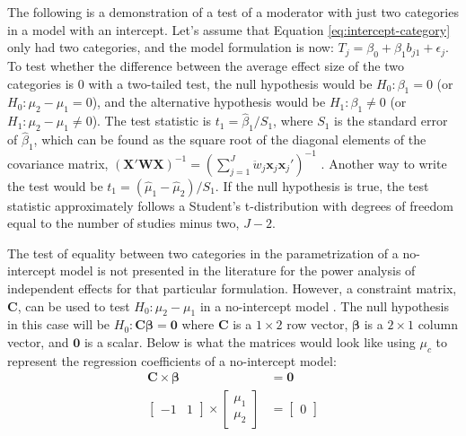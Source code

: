The following is a demonstration of a test of a moderator with just two categories in a model with an intercept. Let's assume that Equation \ref{eq:intercept-category} only had two categories, and the model formulation is now: $T_j = \beta_0 + \beta_1 b_{j1} +\epsilon_j$. To test whether the difference between the average effect size of the two categories is 0 with a two-tailed test, the null hypothesis would be $H_0: \beta_1 = 0$ (or $H_0: \mu_2 - \mu_1 = 0$), and the alternative hypothesis would be $H_1: \beta_1 \neq 0$ (or $H_1: \mu_2 - \mu_1 \neq 0$). The test statistic is $t_1 = \hat{\beta}_1 / S_1$, where $S_1$ is the standard error of $\hat{\beta}_1$, which can be found as the square root of the diagonal elements of the covariance matrix, $(\mathbf{X}'\mathbf{W}\mathbf{X})^{-1} = \left( \sum_{j=1}^J \ddot{w}_j\mathbf{x}_j\mathbf{x}_j' \right)^{-1}$ \autocite{cooper2019}. Another way to write the test would be $t_1 = (\hat{\mu}_1 - \hat{\mu}_2)  /S_1$. If the null hypothesis is true, the test statistic approximately follows a Student's t-distribution with degrees of freedom equal to the number of studies minus two, $J-2$.


The test of equality between two categories in the parametrization of a no-intercept model is not presented in the literature for the power analysis of independent effects for that particular formulation. However, a constraint matrix, $\mathbf{C}$, can be used to test $H_0: \mu_2 - \mu_1$ in a no-intercept model \autocite{pustejovsky2018}. The null hypothesis in this case will be $H_0: \mathbf{C}\mathbf{\beta} = \mathbf{0}$ where $\mathbf{C}$ is a $1 \times 2$ row vector,  $\bm{\beta}$ is a  $2 \times 1$ column vector, and  $\mathbf{0}$ is a  scalar. Below is what the matrices would look like using $\mu_c$ to represent the regression coefficients of a no-intercept model:
\begin{equation}
    \begin{split}
        \mathbf{C} \times \bm{\beta} & = \mathbf{0} \\
        \begin{bmatrix}
            -1 & 1 
        \end{bmatrix} \times
        \begin{bmatrix}
            \mu_1 \\
            \mu_2
        \end{bmatrix} & = \begin{bmatrix}
            0 
        \end{bmatrix}
    \end{split}
\end{equation}

